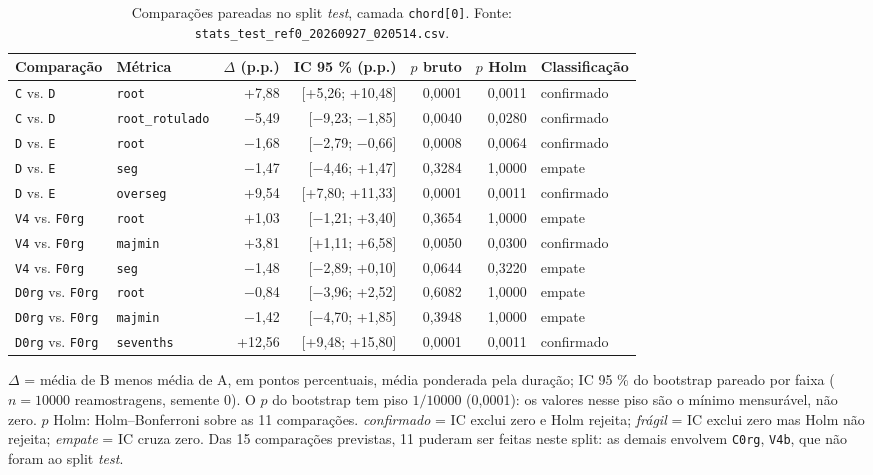 \begin{table}[t]
  \centering
  \caption{Comparações pareadas no split \emph{test}, camada \texttt{chord[0]}. Fonte: \texttt{stats\_test\_ref0\_20260927\_020514.csv}.}
  \label{tab:stats}
  \footnotesize
  \begin{tabular}{llrrrrl}
    \toprule
    Comparação & Métrica & $\Delta$ (p.p.) & IC 95 \% (p.p.) & $p$ bruto & $p$ Holm & Classificação \\
    \midrule
    \texttt{C} vs. \texttt{D} & \texttt{root} & +7,88 & [+5,26; +10,48] & 0,0001 & 0,0011 & confirmado \\
    \texttt{C} vs. \texttt{D} & \texttt{root\_rotulado} & $-$5,49 & [$-$9,23; $-$1,85] & 0,0040 & 0,0280 & confirmado \\
    \texttt{D} vs. \texttt{E} & \texttt{root} & $-$1,68 & [$-$2,79; $-$0,66] & 0,0008 & 0,0064 & confirmado \\
    \texttt{D} vs. \texttt{E} & \texttt{seg} & $-$1,47 & [$-$4,46; +1,47] & 0,3284 & 1,0000 & empate \\
    \texttt{D} vs. \texttt{E} & \texttt{overseg} & +9,54 & [+7,80; +11,33] & 0,0001 & 0,0011 & confirmado \\
    \texttt{V4} vs. \texttt{F0rg} & \texttt{root} & +1,03 & [$-$1,21; +3,40] & 0,3654 & 1,0000 & empate \\
    \texttt{V4} vs. \texttt{F0rg} & \texttt{majmin} & +3,81 & [+1,11; +6,58] & 0,0050 & 0,0300 & confirmado \\
    \texttt{V4} vs. \texttt{F0rg} & \texttt{seg} & $-$1,48 & [$-$2,89; +0,10] & 0,0644 & 0,3220 & empate \\
    \texttt{D0rg} vs. \texttt{F0rg} & \texttt{root} & $-$0,84 & [$-$3,96; +2,52] & 0,6082 & 1,0000 & empate \\
    \texttt{D0rg} vs. \texttt{F0rg} & \texttt{majmin} & $-$1,42 & [$-$4,70; +1,85] & 0,3948 & 1,0000 & empate \\
    \texttt{D0rg} vs. \texttt{F0rg} & \texttt{sevenths} & +12,56 & [+9,48; +15,80] & 0,0001 & 0,0011 & confirmado \\
    \bottomrule
  \end{tabular}
  \vspace{2pt}
  \parbox{\linewidth}{\footnotesize $\Delta$ = média de B menos média de A, em pontos percentuais, média ponderada pela duração; IC 95 \% do bootstrap pareado por faixa ($n = 10000$ reamostragens, semente 0). O $p$ do bootstrap tem piso $1/10000$ (0,0001): os valores nesse piso são o mínimo mensurável, não zero. $p$ Holm: Holm--Bonferroni sobre as 11 comparações. \emph{confirmado} = IC exclui zero e Holm rejeita; \emph{frágil} = IC exclui zero mas Holm não rejeita; \emph{empate} = IC cruza zero. Das 15 comparações previstas, 11 puderam ser feitas neste split: as demais envolvem \texttt{C0rg}, \texttt{V4b}, que não foram ao split \emph{test}.}
\end{table}
